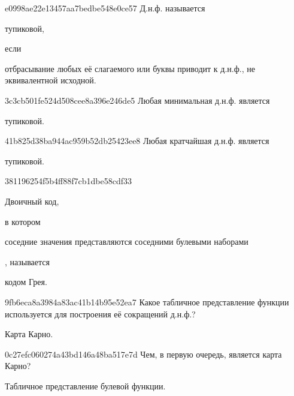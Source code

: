 \begin{note}{e0998ae22e13457aa7bedbe548e0ce57}
    Д.н.ф. называется \begin{icloze}{2}тупиковой,\end{icloze} если \begin{icloze}{1}отбрасывание любых её слагаемого или буквы приводит к д.н.ф., не эквивалентной исходной.\end{icloze}
\end{note}

\begin{note}{3c3cb501fe524d508cee8a396e246de5}
    Любая минимальная д.н.ф. является \begin{icloze}{1}тупиковой.\end{icloze}
\end{note}

\begin{note}{41b825d38ba944ac959b52db25423ee8}
    Любая кратчайшая д.н.ф. является \begin{icloze}{1}тупиковой.\end{icloze}
\end{note}

\begin{note}{381196254f5b4ff88f7cb1dbe58cdf33}
    \begin{icloze}{1}Двоичный код,\end{icloze} в котором \begin{icloze}{2}соседние значения представляются соседними булевыми наборами\end{icloze}, называется \begin{icloze}{3}кодом Грея.\end{icloze}
\end{note}

\begin{note}{9fb6eca8a3984a83ac41b14b95e52ea7}
    Какое табличное представление функции используется для построения её сокращений д.н.ф.?

    \begin{cloze}{1}
        Карта Карно.
    \end{cloze}
\end{note}

\begin{note}{0c27efc060274a43bd146a48ba517e7d}
    Чем, в первую очередь, является карта Карно?

    \begin{cloze}{1}
        Табличное представление булевой функции.
    \end{cloze}
\end{note}

